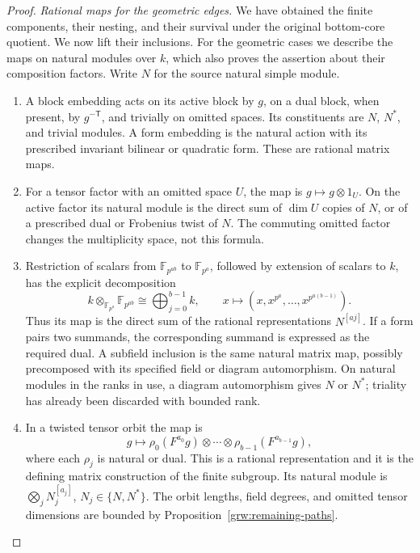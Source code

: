 \begin{proof}
\smallskip\noindent
\emph{Rational maps for the geometric edges.}
We have obtained the finite components, their nesting, and their survival
under the original bottom-core quotient.  We now lift their inclusions.
For the geometric cases we describe the maps on natural modules over $k$,
which also proves the assertion about their composition factors.
Write $N$ for the source natural simple module.
\begin{enumerate}[label=\textup{(\roman*)}]
\item A block embedding acts on its active block by $g$, on a dual
block, when present, by $g^{-\mathsf T}$, and trivially on omitted
spaces.  Its constituents are $N$, $N^*$, and trivial modules.
A form embedding is the natural action with its prescribed invariant
bilinear or quadratic form.  These are rational matrix maps.

\item For a tensor factor with an omitted space $U$, the map is
$g\mapsto g\otimes1_U$.  On the active factor its natural module is
the direct sum of $\dim U$ copies of $N$, or of a prescribed dual or
Frobenius twist of $N$.  The commuting omitted factor changes the
multiplicity space, not this formula.

\item Restriction of scalars from $\mathbb F_{p^{ab}}$ to
$\mathbb F_{p^a}$, followed by extension of scalars to $k$, has the
explicit decomposition
\[
 k\otimes_{\mathbb F_{p^a}}\mathbb F_{p^{ab}}
       \cong\bigoplus_{j=0}^{b-1}k,
 \qquad x\longmapsto(x,x^{p^a},\ldots,x^{p^{a(b-1)}}).
\]
Thus its map is the direct sum of the rational representations
$N^{[aj]}$.  If a form pairs two summands, the corresponding summand
is expressed as the required dual.  A subfield inclusion is the same
natural matrix map, possibly precomposed with its specified field or
diagram automorphism.  On natural modules in the ranks in use, a
diagram automorphism gives $N$ or $N^*$; triality has already been
discarded with bounded rank.

\item In a twisted tensor orbit the map is
\[
 g\longmapsto
       \rho_0(F^{a_0}g)\otimes\cdots\otimes\rho_{b-1}(F^{a_{b-1}}g),
\]
where each $\rho_j$ is natural or dual.  This is a rational
representation and it is the defining matrix construction of the
finite subgroup.  Its natural module is
$\bigotimes_j N_j^{[a_j]}$, $N_j\in\{N,N^*\}$.
The orbit lengths, field degrees, and omitted tensor dimensions are
bounded by Proposition~\ref{grw:remaining-paths}.
\end{enumerate}


\end{proof}
